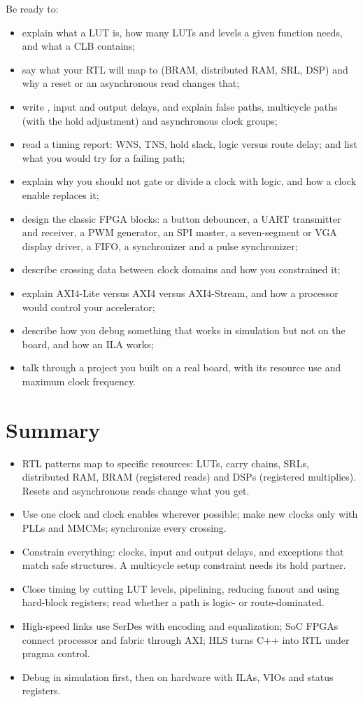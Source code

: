 Be ready to:
\begin{itemize}
  \item explain what a LUT is, how many LUTs and levels a given function needs, and what a CLB contains;
  \item say what your RTL will map to (BRAM, distributed RAM, SRL, DSP) and why a reset or an asynchronous read changes that;
  \item write , input and output delays, and explain false paths, multicycle paths (with the hold adjustment) and asynchronous clock groups;
  \item read a timing report: WNS, TNS, hold slack, logic versus route delay; and list what you would try for a failing path;
  \item explain why you should not gate or divide a clock with logic, and how a clock enable replaces it;
  \item design the classic FPGA blocks: a button debouncer, a UART transmitter and receiver, a PWM generator, an SPI master, a seven-segment or VGA display driver, a FIFO, a synchronizer and a pulse synchronizer;
  \item describe crossing data between clock domains and how you constrained it;
  \item explain AXI4-Lite versus AXI4 versus AXI4-Stream, and how a processor would control your accelerator;
  \item describe how you debug something that works in simulation but not on the board, and how an ILA works;
  \item talk through a project you built on a real board, with its resource use and maximum clock frequency.
\end{itemize}

\section{Summary}

\begin{itemize}
  \item RTL patterns map to specific resources: LUTs, carry chains, SRLs, distributed RAM, BRAM (registered reads) and DSPs (registered multiplies). Resets and asynchronous reads change what you get.
  \item Use one clock and clock enables wherever possible; make new clocks only with PLLs and MMCMs; synchronize every crossing.
  \item Constrain everything: clocks, input and output delays, and exceptions that match safe structures. A multicycle setup constraint needs its hold partner.
  \item Close timing by cutting LUT levels, pipelining, reducing fanout and using hard-block registers; read whether a path is logic- or route-dominated.
  \item High-speed links use SerDes with encoding and equalization; SoC FPGAs connect processor and fabric through AXI; HLS turns C++ into RTL under pragma control.
  \item Debug in simulation first, then on hardware with ILAs, VIOs and status registers.
\end{itemize}
